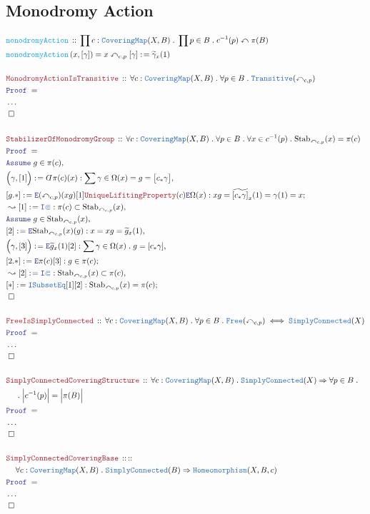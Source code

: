 \documentclass[12pt]{scrartcl}
\newcommand{\TYPE}[1]{\textcolor{NavyBlue}{\mathtt{#1}}}
\newcommand{\FUNC}[1]{\textcolor{Cerulean}{\mathtt{#1}}}
\newcommand{\LOGIC}[1]{\textcolor{Blue}{\mathtt{#1}}}
\newcommand{\THM}[1]{\textcolor{Maroon}{\mathtt{#1}}}
\renewcommand{\.}{\; . \;}
\newcommand{\de}{: \kern 0.1pc =}
\newcommand{\Act}[1]{\left( #1 \right)}
\newcommand{\Theorem}[2]{& \THM{#1} \, :: \, #2 \\ & \Proof = \\ }
\newcommand{\DeclareFunc}[2]{& \FUNC{#1} \, :: \, #2 \\}
\newcommand{\DefineNamedFunc}[4]{&  \FUNC{#1}\Act{#2} = #3 \de #4 \\}
\newcommand{\NewLine}{\\ & \kern 1pc}
\newcommand{\Page}[1]{ \begin{align*} #1 \end{align*}   }
\newcommand{ \bd }{ \ByDef }
\newcommand{\NoProof}{ & \ldots \\ \EndProof}
\newcommand{\Imply}{\Rightarrow}
\newcommand{\Intro}{\LOGIC{I}}
\newcommand{\Elim}{\LOGIC{E}}
\newcommand{\Say}[3]{& #1 \de #2 : #3, \\}
\newcommand{\Conclude}[3]{& #1 \de #2 : #3; \\}
\newcommand{\Derive}[3]{& \leadsto #1 \de #2 : #3, \\}
\newcommand{\AssumeIn}[2]{& \LOGIC{Assume} \; #1 \in #2, \\}
\newcommand{\QED}{\; \square}
\newcommand{\EndProof}{& \QED \\}
\newcommand{\ByDef}{\rotatebox[origin=c]{-180}{$D$}}%
\newcommand{\Proof}{\LOGIC{Proof} \; }
\newcommand{\Stab}{\mathrm{Stab}}
\newcommand{\action}{\curvearrowleft}
\begin{document}
\subsection{Monodromy Action}
\Page{
	\DeclareFunc{monodromyAction}
	{
		\prod c : \TYPE{CoveringMap}(X,B) \.
		\prod p \in B \.
		 c^{-1}(p) \action \pi(B)
	}
	\DefineNamedFunc{monodromyAction}{x,[\gamma]}{x \action_{c,p} [\gamma]}{\widetilde{\gamma}_x(1)}
	\\
	\Theorem{MonodromyActionIsTransitive}
	{
		\forall c : \TYPE{CoveringMap}(X,B) \.
		\forall p \in B \.
		\TYPE{Transitive}(\action_{c,p})
	}
	\NoProof
	\\
	\Theorem{StabilizerOfMonodromyGroup}
	{
		\forall c : \TYPE{CoveringMap}(X,B) \. 
		\forall p \in B \.
		\forall x \in c^{-1}(p) \. 
		\Stab_{\action_{c,p}}(x) =  \pi(c) 
	}
	\AssumeIn{g}{\pi(c)}
	\Say{\Big(\gamma, [1] \Big)}
	{
		\bd \pi(c)(x)	
	}
	{
		\sum \gamma \in \Omega(x) =
		g = \big[c_* \gamma\big] 
	}
	\Conclude{[g.*]}
	{
		\Elim (\action_{c,p})(xg)[1]
		\THM{UniqueLifitingProperty}(c)
		\Elim \Omega(x)
	}
	{  
		xg  = \widetilde{[c_* \gamma]}_x(1)  = \gamma(1) = x  
	}
	\Derive{[1]}{\Intro \TYPE{\Subset}}{\pi(c) \subset \Stab_{\action_{c,p}}(x)}
	\AssumeIn{g}{\Stab_{\action_{c,p}}(x)}
	\Say{[2]}
	{
		\Elim \Stab_{\action_{c,p}}(x)(g) 
	}
	{
		x = xg = \widetilde{g}_x(1)
	}
	\Say{\Big( \gamma  ,[3] \Big)}{ \Elim \widetilde{g}_x(1)[2]  }
	{
		\sum \gamma \in \Omega(x) \. 
		g = [c_* \gamma] 
	}
	\Conclude{[2.*]}{\Elim \pi(c)[3]}
	{
		g \in \pi(c)
	}
	\Derive{[2]}{\Intro \TYPE{\Subset}}{ \Stab_{\action_{c,p}}(x) \subset \pi(c)}
	\Conclude{[*]}{\Intro \TYPE{SubsetEq}[1][2]}
	{
		\Stab_{\action_{c,p}}(x) = \pi(c) 
	}
	\EndProof
	\\
	\Theorem{FreeIsSimplyConnected}
	{
		\forall c : \TYPE{CoveringMap}(X,B) \.
		\forall p \in B \.
		\TYPE{Free}(\action_{c,p}) \iff
		\TYPE{SimplyConnected}(X)
	}
	\NoProof
	\\
	\Theorem{SimplyConnectedCoveringStructure}
	{
		\forall c : \TYPE{CoveringMap}(X,B) \.
		\TYPE{SimplyConnected}(X) \Imply 
		\forall p \in B \. \NewLine \.  
		\Big| c^{-1}(p) \Big| = \Big| \pi(B) \Big|
	}
	\NoProof
	\\
	\Theorem{SimplyConnectedCoveringBase}
	{
		:: \NewLine 
		\forall c : \TYPE{CoveringMap}(X,B) \.
		\TYPE{SimplyConnected}(B) \Imply 
		\TYPE{Homeomorphism}(X,B,c)
	}
	\NoProof
}
\end{document}

